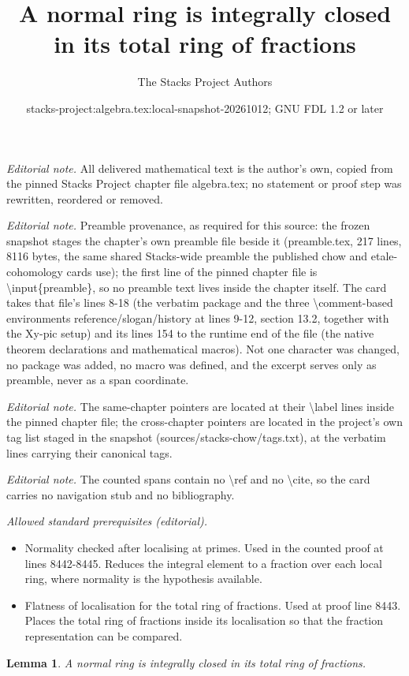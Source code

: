 \documentclass[10pt,a4paper]{amsart}
\title{A normal ring is integrally closed in its total ring of fractions}
\author{The Stacks Project Authors}
\date{stacks-project:algebra.tex:local-snapshot-20261012; GNU FDL 1.2 or later}
\theoremstyle{plain}
\newtheorem{lemma}[subsection]{Lemma}
\theoremstyle{definition}
\theoremstyle{remark}
\numberwithin{equation}{subsection}
\begin{document}
\maketitle
\noindent\textit{Editorial note.} All delivered mathematical text is the author's own, copied from the pinned Stacks Project chapter file algebra.tex; no statement or proof step was rewritten, reordered or removed.\par\medskip
\noindent\textit{Editorial note.} Preamble provenance, as required for this source: the frozen snapshot stages the chapter's own preamble file beside it (preamble.tex, 217 lines, 8116 bytes, the same shared Stacks-wide preamble the published chow and etale-cohomology cards use); the first line of the pinned chapter file is \textbackslash{}input\{preamble\}, so no preamble text lives inside the chapter itself. The card takes that file's lines 8-18 (the verbatim package and the three \textbackslash{}comment-based environments reference/slogan/history at lines 9-12, section 13.2, together with the Xy-pic setup) and its lines 154 to the runtime end of the file (the native theorem declarations and mathematical macros). Not one character was changed, no package was added, no macro was defined, and the excerpt serves only as preamble, never as a span coordinate.\par\medskip
\noindent\textit{Editorial note.} The same-chapter pointers are located at their \textbackslash{}label lines inside the pinned chapter file; the cross-chapter pointers are located in the project's own tag list staged in the snapshot (sources/stacks-chow/tags.txt), at the verbatim lines carrying their canonical tags.\par\medskip
\noindent\textit{Editorial note.} The counted spans contain no \textbackslash{}ref and no \textbackslash{}cite, so the card carries no navigation stub and no bibliography.\par\medskip
\noindent\textit{Allowed standard prerequisites (editorial).}\begin{itemize}
\item Normality checked after localising at primes. Used in the counted proof at lines 8442-8445. Reduces the integral element to a fraction over each local ring, where normality is the hypothesis available.
\item Flatness of localisation for the total ring of fractions. Used at proof line 8443. Places the total ring of fractions inside its localisation so that the fraction representation can be compared.
\end{itemize}\medskip
\begin{lemma}
\label{lemma-normal-ring-integrally-closed}
A normal ring is integrally closed in its total ring of fractions.
\end{lemma}
\end{document}
